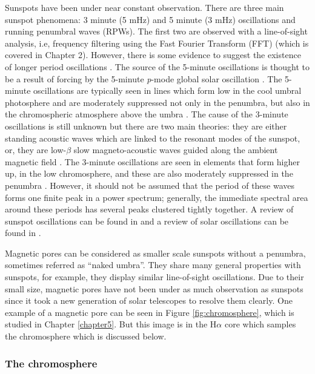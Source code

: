     Sunspots have been under near constant observation.
    There are three main sunspot phenomena: 3 minute (5 mHz) and 5 minute (3 mHz) oscillations and running penumbral waves (RPWs).
    The first two are observed with a line-of-sight analysis, i.e, frequency filtering using the Fast Fourier Transform (FFT) (which is covered in Chapter 2).
    However, there is some evidence to suggest the existence of longer period oscillations \citep{LPO,SOS,Chorley2011}.
    The source of the 5-minute oscillations is thought to be a result of forcing by the 5-minute \textit{p}-mode global solar oscillation \citep{OWS,WAUO}.
    The 5-minute oscillations are typically seen in lines which form low in the cool umbral photosphere and are moderately suppressed not only in the penumbra, but also in the chromospheric atmosphere above the umbra \citep{OASO}.
    The cause of the 3-minute oscillations is still unknown but there are two main theories: they are either standing acoustic waves which are linked to the resonant modes of the sunspot, or, they are low-$\beta$ slow magneto-acoustic waves guided along the ambient magnetic field \citep{UTMO,OWS,OASO,ORWS}.
    The 3-minute oscillations are seen in elements that form higher up, in the low chromosphere, and these are also moderately suppressed in the penumbra \citep{OASO}.
    However, it should not be assumed that the period of these waves forms one finite peak in a power spectrum; generally, the immediate spectral area around these periods has several peaks clustered tightly together.
    A review of sunspot oscillations can be found in \citep{OASO} and a review of solar oscillations can be found in \citep{SO}.

    Magnetic pores can be considered as smaller scale sunspots without a penumbra, sometimes referred as ``naked umbra''.
    They share many general properties with sunspots, for example, they display similar line-of-sight oscillations.
    Due to their small size, magnetic pores have not been under as much observation as sunspots since it took a new generation of solar telescopes to resolve them clearly.
    One example of a magnetic pore can be seen in Figure \ref{fig:chromosphere}, which is studied in Chapter \ref{chapter5}.
    But this image is in the H$\alpha$ core which samples the chromosphere which is discussed below.
        
\subsubsection{The chromosphere}
\label{chromo}


